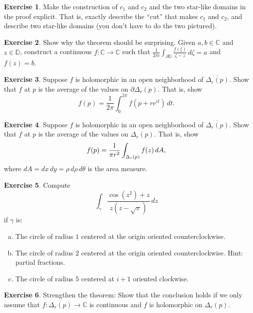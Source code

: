 \documentclass[12pt,openany]{book}
\newcommand{\glsadd}[2][]{}
\newcommand{\avoidbreak}{\postdisplaypenalty=100}
\newcommand{\C}{{\mathbb{C}}}
\newcommand{\D}{{\mathbb{D}}}
\newcommand{\myquote}[1]{``#1''}
\theoremstyle{plain}
\theoremstyle{remark}
\theoremstyle{definition}
\newenvironment{exbox}{%
    \def\FrameCommand{\vrule width 1pt \relax\hspace{10pt}}%
    \MakeFramed{\advance\hsize-\width\FrameRestore}%
}{%
    \endMakeFramed
}
\newenvironment{exparts}{%
    \leavevmode\begin{enumerate}[a),noitemsep,topsep=0pt,parsep=0pt,partopsep=0pt]
}{%
    \end{enumerate}
}
\theoremstyle{exercise}
\newtheorem{exercise}{Exercise}[section]
\theoremstyle{example}
\begin{document}
\begin{exbox}
\begin{exercise}
Make the construction of $c_1$ and $c_2$ and the two star-like domains
in the proof explicit.  That is, exactly describe the \myquote{cut} that makes
$c_1$ and $c_2$, and describe two star-like domains (you don't have to do the
two pictured).
\end{exercise}

\begin{exercise}
Show why the theorem should be surprising.  Given $a,b \in \C$ and $z \in \D$,
construct a continuous 
$f \colon \C \to \C$ such that $\frac{1}{2\pi i}\int_{\partial \D}
\frac{f(\zeta)}{\zeta -z} \, d\zeta = a$ and $f(z) = b$.
\end{exercise}

\begin{exercise}
Suppose $f$ is holomorphic in an open neighborhood of $\overline{\Delta_r(p)}$.
Show that $f$ at $p$ is the average of the values on $\partial \Delta_r(p)$.
That is, show
\begin{equation*}
f(p) = \frac{1}{2\pi} \int_0^{2\pi} f(p + r e^{it}) \, dt .
\end{equation*}
\end{exercise}

\begin{exercise}
Suppose $f$ is holomorphic in an open neighborhood of $\overline{\Delta_r(p)}$.
Show that $f$ at $p$ is the average of the values on $\Delta_r(p)$.
That is, show
\begin{equation*}
f(p) = \frac{1}{\pi r^2} \int_{\Delta_r(p)} f(z) \, dA ,
\avoidbreak
\end{equation*}
\glsadd{not:dA}%
where $dA = dx \, dy = \rho \, d\rho \, d\theta$ is the area measure.
\end{exercise}

\begin{exercise}
\pagebreak[3]
Compute 
\begin{equation*}
\int_\gamma \frac{\cos ( z^2 ) +z}{z(z-\sqrt{\pi})} \, dz
\end{equation*}
if $\gamma$ is:
\begin{exparts}
\item
The circle of radius $1$ centered at the origin oriented
counterclockwise.
\item
The circle of radius $2$ centered at the origin oriented
counterclockwise.  Hint: partial fractions.
\item
The circle of radius $5$ centered at $i+1$ oriented clockwise.
\end{exparts}
\end{exercise}

\begin{exercise} \label{exercise:strongerCIFdisc}
Strengthen the theorem:  Show that the conclusion holds if
we only assume that $f \colon \overline{\Delta_r(p)} \to \C$
is continuous and $f$ is holomorphic on $\Delta_r(p)$.
\end{exercise}
\end{exbox}
\end{document}
